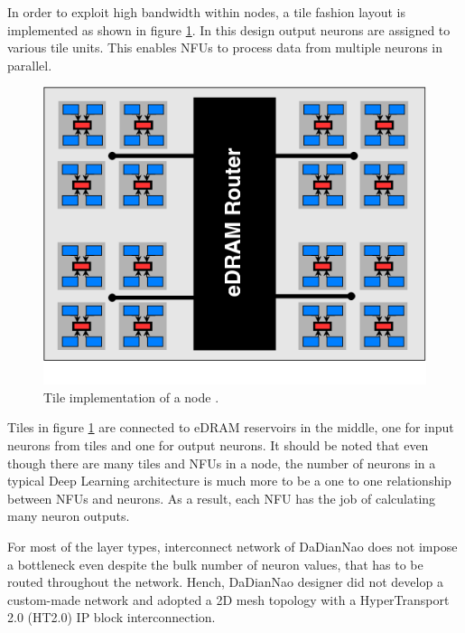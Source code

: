 \documentclass[runningheads,a4paper]{llncs}
\begin{document}
{In order to exploit high bandwidth within nodes, a tile fashion layout is implemented as shown in figure \ref{fig:tiles}. In this design output neurons are assigned to various tile units. This enables NFUs to process data from multiple neurons in parallel.
\begin{figure}[h]
	\includegraphics[scale=0.23]{./images/dadiannao_tile.png}
	\centering
	\caption{Tile implementation of a node \cite{chen2014dadiannao}.}
	\label{fig:tiles}
\end{figure}

Tiles in figure \ref{fig:tiles} are connected to eDRAM reservoirs in the middle, one for input neurons from tiles and one for output neurons. It should be noted that even though there are many tiles and NFUs in a node, the number of neurons in a typical Deep Learning architecture is much more to be a one to one relationship between NFUs and neurons. As a result, each NFU has the job of calculating many neuron outputs.

For most of the layer types, interconnect network of DaDianNao does not impose a bottleneck even despite the bulk number of neuron values, that has to be routed throughout the network. Hench, DaDianNao designer did not develop a custom-made network and adopted a 2D mesh topology with a HyperTransport 2.0 (HT2.0) IP block interconnection.

}
\end{document}
